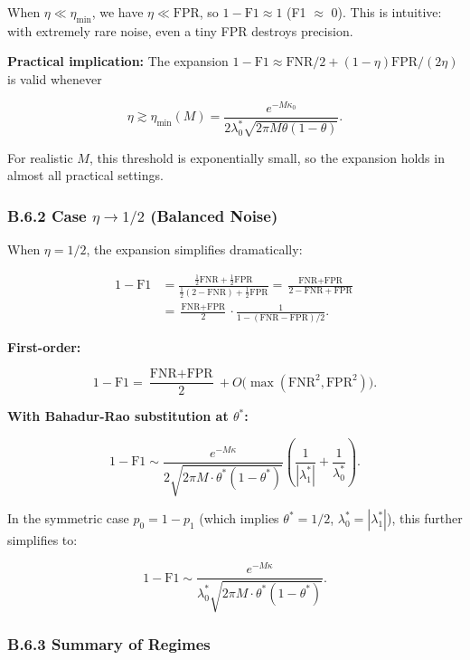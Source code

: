 \documentclass[
  12pt,
]{article}
\begin{document}
When \(\eta \ll \eta_{\min}\), we have \(\eta \ll \text{FPR}\), so
\(1-\text{F1} \approx 1\) (F1 \(\approx\) 0). This is intuitive: with
extremely rare noise, even a tiny FPR destroys precision.

\textbf{Practical implication:} The expansion
\(1-\text{F1} \approx \text{FNR}/2 + (1-\eta)\text{FPR}/(2\eta)\) is
valid whenever

\[\eta \gtrsim \eta_{\min}(M) = \frac{e^{-M\kappa_0}}{2\lambda_0^*\sqrt{2\pi M \theta(1-\theta)}}.\]

For realistic \(M\), this threshold is exponentially small, so the
expansion holds in almost all practical settings.

\subsubsection{\texorpdfstring{B.6.2 Case \(\eta \to 1/2\) (Balanced
Noise)}{B.6.2 Case \textbackslash eta \textbackslash to 1/2 (Balanced Noise)}}\label{b.6.2-case-eta-to-12-balanced-noise}

When \(\eta = 1/2\), the expansion simplifies dramatically:

\[\begin{aligned}
1 - \text{F1} &= \frac{\frac{1}{2}\text{FNR} + \frac{1}{2}\text{FPR}}
{\frac{1}{2}(2-\text{FNR}) + \frac{1}{2}\text{FPR}}
= \frac{\text{FNR} + \text{FPR}}{2 - \text{FNR} + \text{FPR}} \\
&= \frac{\text{FNR}+\text{FPR}}{2} \cdot \frac{1}{1 - (\text{FNR}-\text{FPR})/2}.
\end{aligned}\]

\textbf{First-order:}

\[1 - \text{F1} = \frac{\text{FNR} + \text{FPR}}{2} + O\big(\max(\text{FNR}^2,\text{FPR}^2)\big).\]

\textbf{With Bahadur-Rao substitution at \(\theta^*\):}

\[
1 - \text{F1} \sim \frac{e^{-M\kappa}}{2\sqrt{2\pi M \cdot \theta^*(1-\theta^*)}}
\left(\frac{1}{|\lambda_1^*|} + \frac{1}{\lambda_0^*}\right).
\]

In the symmetric case \(p_0 = 1-p_1\) (which implies \(\theta^* = 1/2\),
\(\lambda_0^* = |\lambda_1^*|\)), this further simplifies to:

\[1 - \text{F1} \sim \frac{e^{-M\kappa}}{\lambda_0^* \sqrt{2\pi M \cdot \theta^*(1-\theta^*)}}.\]

\subsubsection{B.6.3 Summary of Regimes}\label{b.6.3-summary-of-regimes}
\end{document}

